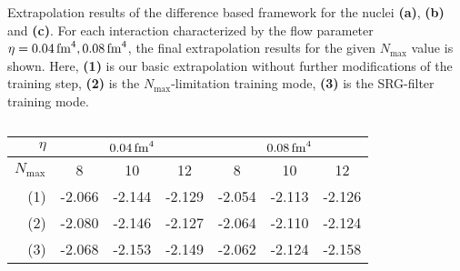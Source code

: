 \begin{table}[H]
  \caption{Extrapolation results of the difference based framework for the nuclei  \textbf{(a)},  \textbf{(b)} and  \textbf{(c)}. For each interaction characterized by the flow parameter $\eta = \srg{0.04}, \srg{0.08}$, the final extrapolation results for the given $N_\mathrm{max}$ value is shown. Here, \textbf{(1)} is our basic extrapolation without further modifications of the training step, \textbf{(2)} is the $N_\mathrm{max}$-limitation training mode, \textbf{(3)} is the SRG-filter training mode. }
  \label{tab:eval_diff}
  \centering
  \begin{subtable}{\textwidth}
    \caption{}
    \centering
    \begin{tabular}{
        r|
        S[table-format=-2.3(3)]
        S[table-format=-2.3(3)]
        S[table-format=-2.3(3)]
        S[table-format=-2.3(3)]
        S[table-format=-2.3(3)]
        S[table-format=-2.3(3)]
      }
      \toprule
      $\eta$                           &
       &
         \\
      \midrule
      $N_\mathrm{max}$                 &
      {8}                              &
      {10}                             &
      {12}                             &
      {8}                              &
      {10}                             &
      {12}                               \\
      \midrule
      (1)                              &
      -2.066                  &
      -2.144                  &
      -2.129                  &
      -2.054                  &
      -2.113                  &
      -2.126                    \\
      (2)                              &
      -2.080                  &
      -2.146                  &
      -2.127                  &
      -2.064                  &
      -2.110                  &
      -2.124                    \\
      (3)                              &
      -2.068                  &
      -2.153                  &
      -2.149                  &
      -2.062                  &
      -2.124                  &
      -2.158                    \\
      \bottomrule
    \end{tabular}

\end{subtable}
\end{table}
